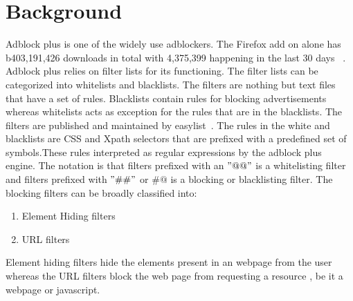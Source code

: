 \section{Background}
Adblock plus is one of the widely use adblockers.
The Firefox add on alone has b403,191,426 downloads in total with 4,375,399 happening in the last 30 days ~\cite{abpmoz}.
Adblock plus relies  on filter lists for  its functioning.
The filter lists can be categorized into whitelists and blacklists.
The filters are nothing but text files that  have  a set of rules.
Blacklists contain rules for blocking advertisements whereas whitelists acts as exception for the rules that are in the blacklists.
The filters are  published and maintained by easylist~\cite{easylist}.
The rules in the white and blacklists are CSS and Xpath selectors that are prefixed with a predefined set of symbols.These rules interpreted as regular expressions by the adblock plus engine.
The notation is that filters prefixed with an $"@@"$ is a whitelisting filter and  filters prefixed with $"\#\#"$
or $\#@$  is  a blocking or blacklisting filter.
The blocking filters can be broadly classified into:
\begin{enumerate}
\item Element Hiding filters
\item URL filters
\end{enumerate}
Element hiding filters hide the elements present in an webpage from the user whereas the URL filters block the web page from requesting a resource , be it a webpage or javascript.
